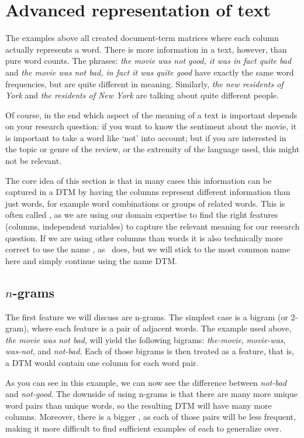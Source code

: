 \section{Advanced representation of text}
\label{sec:ngram}

The examples above all created document-term matrices where each column actually represents a word.
There is more information in a text, however, than pure word counts.
The phrases: \emph{the movie was not good, it was in fact quite bad} and \emph{the movie was not bad, in fact it was quite good}
have exactly the same word frequencies, but are quite different in meaning.
Similarly, \emph{the new residents of York} and \emph{the residents of New York} are talking about quite different people. 

Of course, in the end which aspect of the meaning of a text is important depends on your research question:
if you want to know the sentiment about the movie, it is important to take a word like `not' into account;
but if you are interested in the topic or genre of the review, or the extremity of the language used, this might not be relevant.

The core idea of this section is that in many cases this information can be captured in a DTM by having the columns represent different information than just words, for example word combinations or groups of related words.
This is often called , as we are using our domain expertise to find the right features (columns, independent variables) to capture the relevant meaning for our research question.
If we are using other columns than words it is also technically more correct to use the name , as \quanteda\ does, but we will stick to the most common name here and simply continue using the name DTM.

\subsection{$n$-grams}
The first feature we will discuss are n-grams.
The simplest case is a bigram (or 2-gram), where each feature is a pair of adjacent words.
The example used above, \emph{the movie was not bad}, will yield the following bigrams: \emph{the-movie}, \emph{movie-was}, \emph{was-not}, and \emph{not-bad}.
Each of those bigrams is then treated as a feature, that is, a DTM would contain one column for each word pair.

As you can see in this example, we can now see the difference between \emph{not-bad} and \emph{not-good}.
The downside of using n-grams is that there are many more unique word pairs than unique words,
so the resulting DTM will have many more columns.
Moreover, there is a bigger , as each of those pairs will be less frequent,
making it more difficult to find sufficient examples of each to generalize over.

